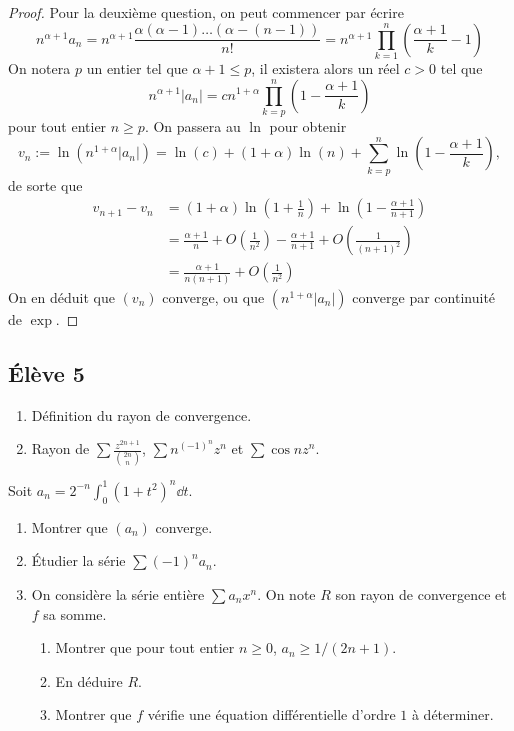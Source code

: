 \documentclass[10pt]{scrartcl}
\begin{document}
    \begin{proof}
        Pour la deuxième question, on peut commencer par écrire 
        \[
            n^{\alpha+1}a_n=n^{\alpha+1}\frac{\alpha(\alpha-1)\dots(\alpha-(n-1))}{n!}=n^{\alpha+1}\prod_{k=1}^n\left(\frac{\alpha+1}k-1\right)
        \]
        On notera $p$ un entier tel que $\alpha+1\leq p$, il existera alors un réel $c>0$ tel que 
        \[
            n^{\alpha+1}|a_n|=cn^{1+\alpha}\prod_{k=p}^n\left(1-\frac{\alpha+1}k\right)
        \]
        pour tout entier $n\geq p$. 
        On passera au $\ln$ pour obtenir 
        \[
            v_n:=\ln(n^{1+\alpha}|a_n|)=\ln(c)+(1+\alpha)\ln(n)+\sum_{k=p}^n\ln\left(1-\frac{\alpha+1}k\right),
        \]
        de sorte que 
        \begin{align*}
            v_{n+1}-v_n &= (1+\alpha)\ln\left(1+\frac1n\right)+\ln\left(1-\frac{\alpha+1}{n+1}\right)\\
                        &= \frac{\alpha+1}n+O\left(\frac1{n^2}\right)-\frac{\alpha+1}{n+1}+O\left(\frac1{(n+1)^2}\right)\\
                        &= \frac{\alpha+1}{n(n+1)}+O\left(\frac1{n^2}\right)
        \end{align*}
        On en déduit que $(v_n)$ converge, ou que $(n^{1+\alpha}|a_n|)$ converge par continuité de $\exp$. 
    \end{proof}


    \subsection*{Élève 5}

    \begin{ccp}\hfill
        \begin{enumerate}
            \item Définition du rayon de convergence.
            \item Rayon de $\sum \frac{z^{2n+1}}{\binom {2n}n}$, $\sum n^{(-1)^n}z^n$ et $\sum \cos n z^n$.
        \end{enumerate}
    \end{ccp}

    \begin{exo}
        Soit $a_n=2^{-n}\int_0^1(1+t^2)^n\dd t$. 
        \begin{enumerate}
            \item Montrer que $(a_n)$ converge.
            \item Étudier la série $\sum (-1)^na_n$.
            \item On considère la série entière $\sum a_nx^n$. On note $R$ son rayon de convergence et $f$ sa somme.
            \begin{enumerate}
                \item Montrer que pour tout entier $n\geq0$, $a_n\geq 1/(2n+1)$. 
                \item En déduire $R$.
                \item Montrer que $f$ vérifie une équation différentielle d'ordre $1$ à déterminer.
            \end{enumerate}
        \end{enumerate}
    \end{exo}
\end{document}
